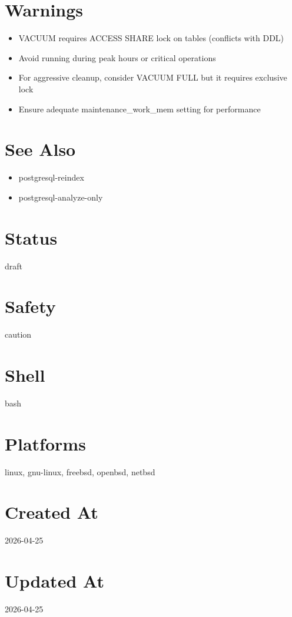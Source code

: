 \documentclass{article}
\begin{document}
\section*{Warnings}
\begin{itemize}
  \item VACUUM requires ACCESS SHARE lock on tables (conflicts with DDL)
  \item Avoid running during peak hours or critical operations
  \item For aggressive cleanup, consider VACUUM FULL but it requires exclusive lock
  \item Ensure adequate maintenance\_work\_mem setting for performance
\end{itemize}

\section*{See Also}
\begin{itemize}
  \item postgresql-reindex
  \item postgresql-analyze-only
\end{itemize}

\section*{Status}
draft

\section*{Safety}
caution

\section*{Shell}
bash

\section*{Platforms}
linux, gnu-linux, freebsd, openbsd, netbsd

\section*{Created At}
2026-04-25

\section*{Updated At}
2026-04-25
\end{document}
